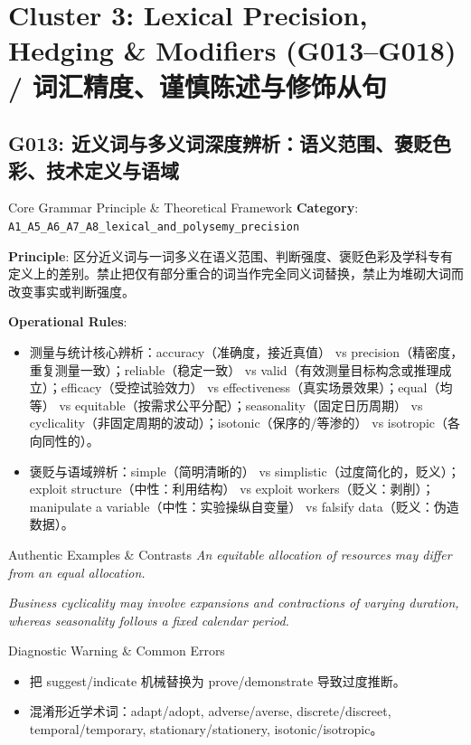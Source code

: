 \section{Cluster 3: Lexical Precision, Hedging \& Modifiers (G013--G018) / 词汇精度、谨慎陈述与修饰从句}
\subsection{G013: 近义词与多义词深度辨析：语义范围、褒贬色彩、技术定义与语域}\label{sec:rule:G013}
\begin{ConceptBox}{Core Grammar Principle \& Theoretical Framework}
\textbf{Category}: \texttt{A1\_A5\_A6\_A7\_A8\_lexical\_and\_polysemy\_precision}\par\vspace{3pt}
\textbf{Principle}: 区分近义词与一词多义在语义范围、判断强度、褒贬色彩及学科专有定义上的差别。禁止把仅有部分重合的词当作完全同义词替换，禁止为堆砌大词而改变事实或判断强度。\par\vspace{4pt}
\textbf{Operational Rules}:
\begin{itemize}[leftmargin=1.5em, itemsep=1pt]
  \item 测量与统计核心辨析：accuracy（准确度，接近真值） vs precision（精密度，重复测量一致）；reliable（稳定一致） vs valid（有效测量目标构念或推理成立）；efficacy（受控试验效力） vs effectiveness（真实场景效果）；equal（均等） vs equitable（按需求公平分配）；seasonality（固定日历周期） vs cyclicality（非固定周期的波动）；isotonic（保序的/等渗的） vs isotropic（各向同性的）。
  \item 褒贬与语域辨析：simple（简明清晰的） vs simplistic（过度简化的，贬义）；exploit structure（中性：利用结构） vs exploit workers（贬义：剥削）；manipulate a variable（中性：实验操纵自变量） vs falsify data（贬义：伪造数据）。
\end{itemize}
\end{ConceptBox}
\begin{ExampleBox}{Authentic Examples \& Contrasts}
\textit{An equitable allocation of resources may differ from an equal allocation.}\par\vspace{2pt}
\textit{Business cyclicality may involve expansions and contractions of varying duration, whereas seasonality follows a fixed calendar period.}\par\vspace{2pt}
\end{ExampleBox}
\begin{TipBox}{Diagnostic Warning \& Common Errors}
\begin{itemize}[leftmargin=1.5em, itemsep=1pt]
  \item 把 suggest/indicate 机械替换为 prove/demonstrate 导致过度推断。
  \item 混淆形近学术词：adapt/adopt, adverse/averse, discrete/discreet, temporal/temporary, stationary/stationery, isotonic/isotropic。
\end{itemize}
\end{TipBox}
\vspace{6pt}
